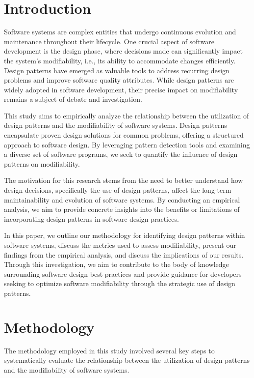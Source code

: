 \documentclass[conference]{IEEEtran}
\begin{document}
	\section{Introduction}
	Software systems are complex entities that undergo continuous evolution and maintenance throughout their lifecycle. One crucial aspect of software development is the design phase, where decisions made can significantly impact the system's modifiability, i.e., its ability to accommodate changes efficiently. Design patterns have emerged as valuable tools to address recurring design problems and improve software quality attributes. While design patterns are widely adopted in software development, their precise impact on modifiability remains a subject of debate and investigation.
	
	This study aims to empirically analyze the relationship between the utilization of design patterns and the modifiability of software systems. Design patterns encapsulate proven design solutions for common problems, offering a structured approach to software design. By leveraging pattern detection tools and examining a diverse set of software programs, we seek to quantify the influence of design patterns on modifiability.
	
	The motivation for this research stems from the need to better understand how design decisions, specifically the use of design patterns, affect the long-term maintainability and evolution of software systems. By conducting an empirical analysis, we aim to provide concrete insights into the benefits or limitations of incorporating design patterns in software design practices.
	
	In this paper, we outline our methodology for identifying design patterns within software systems, discuss the metrics used to assess modifiability, present our findings from the empirical analysis, and discuss the implications of our results. Through this investigation, we aim to contribute to the body of knowledge surrounding software design best practices and provide guidance for developers seeking to optimize software modifiability through the strategic use of design patterns.
	
	\section{Methodology}
	The methodology employed in this study involved several key steps to systematically evaluate the relationship between the utilization of design patterns and the modifiability of software systems.
	
\end{document}

